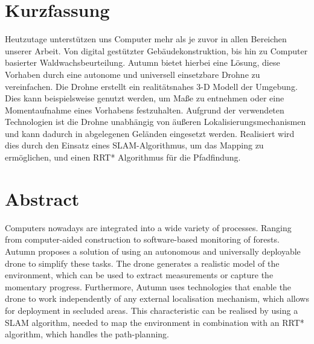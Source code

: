 \chapter{Kurzfassung}

\vspace{10mm}

Heutzutage unterstützen uns Computer mehr als je zuvor in allen Bereichen unserer Arbeit. Von digital gestützter Gebäudekonstruktion, bis hin zu Computer basierter Waldwachsbeurteilung. Autumn bietet hierbei eine Lösung, diese Vorhaben durch eine autonome und universell einsetzbare Drohne zu vereinfachen. Die Drohne erstellt ein realitätsnahes 3-D Modell der Umgebung. Dies kann beispielsweise genutzt werden, um Maße zu entnehmen oder eine Momentaufnahme eines Vorhabens festzuhalten. Aufgrund der verwendeten Technologien ist die Drohne unabhängig von äußeren Lokalisierungsmechanismen und kann dadurch in abgelegenen Geländen eingesetzt werden. Realisiert wird dies durch den Einsatz eines SLAM-Algorithmus, um das Mapping zu ermöglichen, und einen RRT* Algorithmus für die Pfadfindung.

\chapter{Abstract}

\vspace{10mm}

Computers nowadays are integrated into a wide variety of processes. Ranging from computer-aided construction to software-based monitoring of forests. Autumn proposes a solution of using an autonomous and universally deployable drone to simplify these tasks. The drone generates a realistic model of the environment, which can be used to extract measurements or capture the momentary progress. Furthermore, Autumn uses technologies that enable the drone to work independently of any external localisation mechanism, which allows for deployment in secluded areas. This characteristic can be realised by using a SLAM algorithm, needed to map the environment in combination with an RRT* algorithm, which handles the path-planning.
